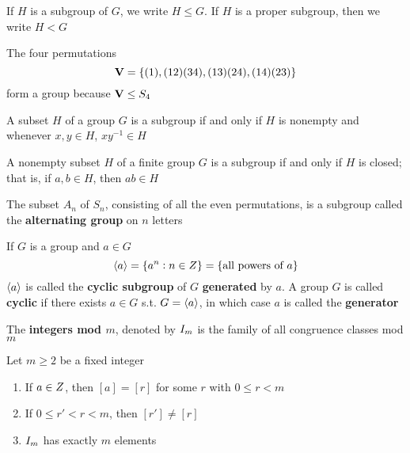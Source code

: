 \documentclass[11pt]{article}
\begin{document}
If \(H\) is a subgroup of \(G\), we write \(H\le G\). If \(H\) is a proper subgroup,
then we write \(H<G\)

The four permutations
\begin{equation*}
\operatorname{\textbf{V}}=\{(1),(1 2)(3 4),(1 3)(2 4),(1 4)(2 3)\}
\end{equation*}
form a group because \(\operatorname{\textbf{V}}\le S_4\)

\begin{proposition}[]
A subset \(H\) of a group \(G\) is a subgroup if and only if \(H\) is nonempty and
whenever \(x,y\in H\), \(xy^{-1}\in H\)
\end{proposition}

\begin{proposition}[]
A nonempty subset \(H\) of a finite group \(G\) is a subgroup if and only if \(H\)
is closed; that is, if \(a,b\in H\), then \(ab\in H\)
\end{proposition}

\begin{examplle}[]
The subset \(A_n\) of \(S_n\), consisting of all the even permutations, is a
subgroup called the \textbf{alternating group} on \(n\) letters
\end{examplle}

\begin{definition}[]
If \(G\) is a group and \(a\in G\)
\begin{equation*}
\langle a\rangle=\{a^n:n\in\relax{Z}\}=\{\text{all powers of } a\}
\end{equation*}
\(\langle a\rangle\) is called the \textbf{cyclic subgroup} of \(G\) \textbf{generated} by \(a\). A
group \(G\) is called \textbf{cyclic} if there exists \(a\in G\) s.t. \(G=\langle a\rangle\),
in which case \(a\) is called the \textbf{generator}
\end{definition}

\begin{definition}[]
The \textbf{integers mod \(m\)}, denoted by \(\relax{I}_m\) is the family of all congruence
classes mod \(m\)
\end{definition}


\begin{proposition}[]
Let \(m\ge 2\) be a fixed integer
\begin{enumerate}
\item If \(a\in \relax{Z}\), then \([a]=[r]\) for some \(r\) with \(0\le r<m\)
\item If \(0\le r'<r<m\), then \([r']\neq[r]\)
\item \(\relax{I}_m\) has exactly \(m\) elements
\end{enumerate}
\end{proposition}
\end{document}
